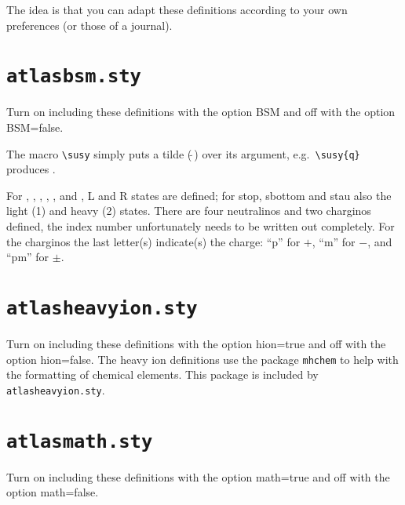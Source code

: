 \documentclass[UKenglish,texlive=2013]{\ATLASLATEXPATH atlasdoc}
\newcommand{\File}[1]{\texttt{#1}\xspace}
\newcommand{\Macro}[1]{\texttt{\textbackslash #1}\xspace}
\newcommand{\Option}[1]{\textsf{#1}\xspace}
\newcommand{\Package}[1]{\texttt{#1}\xspace}
\begin{document}
{The idea is that you can adapt these definitions according to your own preferences (or those of a journal).


\newpage
\section{\File{atlasbsm.sty}}

Turn on including these definitions with the option \Option{BSM} and off with the option \Option{BSM=false}.

The macro \Macro{susy} simply puts a tilde ($\tilde{\ }$) over its argument,
e.g.\ \verb|\susy{q}| produces .

For , , , \slepton, \sel, \smu and
\stau, L and R states are defined; for stop, sbottom and stau also the
light (1) and heavy (2) states.
There are four neutralinos and two charginos defined, 
the index number unfortunately needs to be written out completely. 
For the charginos the last letter(s) indicate(s) the charge: 
\enquote{p} for $+$, \enquote{m} for $-$, and \enquote{pm} for $\pm$.




\newpage
\section{\File{atlasheavyion.sty}}

Turn on including these definitions with the option \Option{hion=true} and off with the option \Option{hion=false}.
The heavy ion definitions use the package \Package{mhchem} to help with the formatting of chemical elements.
This package is included by \File{atlasheavyion.sty}.



%
%


\newpage
\section{\File{atlasmath.sty}}

Turn on including these definitions with the option \Option{math=true} and off with the option \Option{math=false}.

}
\end{document}
